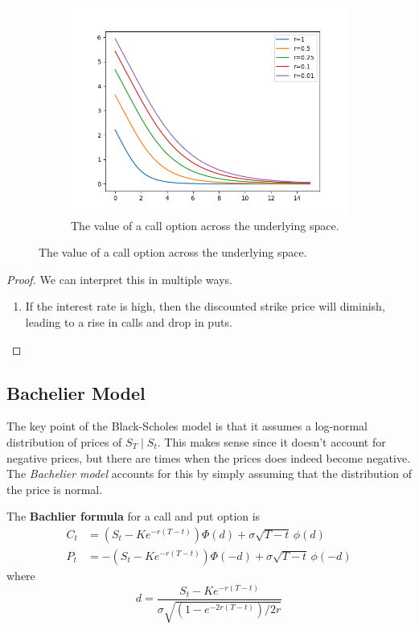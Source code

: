 \documentclass{article}
\begin{document}
\begin{theorem}
\begin{figure}[H]
\begin{subfigure}[b]{0.48\textwidth}
          \includegraphics[width=\textwidth]{img/bs_put_wrt_r.png}
          \caption{The value of a call option across the underlying space. }
          \label{fig:bs_put_wrt_r}
        \end{subfigure}
        \label{fig:bs_wrt_r}
      \end{figure}
    \end{theorem}
    \begin{proof}
      We can interpret this in multiple ways. 
      \begin{enumerate}
        \item If the interest rate is high, then the discounted strike price will diminish, leading to a rise in calls and drop in puts. 
      \end{enumerate}
    \end{proof}

  \subsection{Bachelier Model}

    The key point of the Black-Scholes model is that it assumes a log-normal distribution of prices of $S_T \mid S_t$. This makes sense since it doesn't account for negative prices, but there are times when the prices does indeed become negative. The \textit{Bachelier model} accounts for this by simply assuming that the distribution of the price is normal. 

    \begin{definition}
      The \textbf{Bachlier formula} for a call and put option is 
      \begin{align*}
        C_t & = (S_t - K e^{-r (T - t)}) \Phi(d) + \sigma \sqrt{T - t} \, \phi(d) \\
        P_t & = -(S_t - K e^{-r (T - t)}) \Phi(-d) + \sigma \sqrt{T - t} \, \phi(-d) 
      \end{align*}
      where 
      \begin{equation}
        d = \frac{S_t - K e^{-r (T - t)}}{\sigma \sqrt{(1 - e^{-2r(T - t)}) / 2 r}}
      \end{equation}
    \end{definition}
\end{document}

